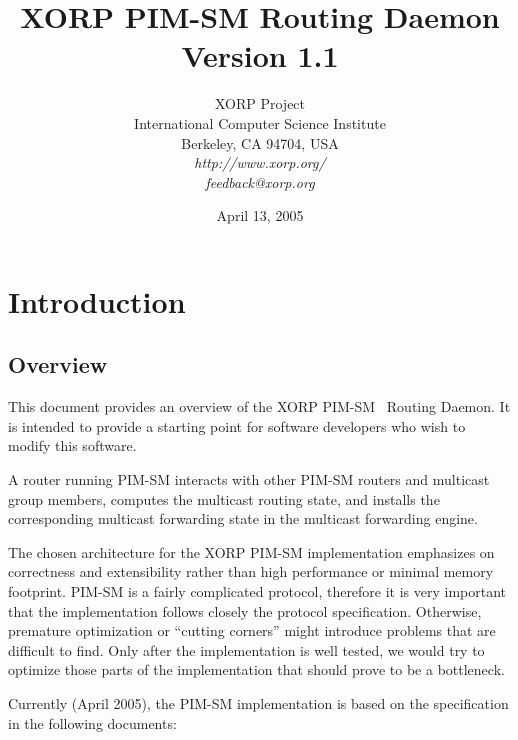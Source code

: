 \documentclass[11pt]{article}
\begin{document}
\title{XORP PIM-SM Routing Daemon \\
\vspace{1ex}
Version 1.1}
\author{ XORP Project					\\
	 International Computer Science Institute	\\
	 Berkeley, CA 94704, USA			\\
         {\it http://www.xorp.org/}			\\
	 {\it feedback@xorp.org}
}
\date{April 13, 2005}

\maketitle

\thispagestyle{empty}


\section{Introduction}


\subsection{Overview}

This document provides an overview of the XORP PIM-SM~\cite{PIM-SM}
Routing Daemon. It is intended to provide a starting point for software
developers who wish to modify this software.

A router running PIM-SM interacts with other PIM-SM routers and
multicast group members, computes the multicast routing state, and installs
the corresponding multicast forwarding state in the multicast forwarding
engine.

The chosen architecture for the XORP PIM-SM implementation emphasizes on
correctness and extensibility rather than high performance or minimal
memory footprint. PIM-SM is a fairly complicated protocol, therefore it
is very important that the implementation follows closely the protocol
specification. Otherwise, premature optimization or ``cutting corners''
might introduce problems that are difficult to find. Only after the
implementation is well tested, we would
try to optimize those parts of the implementation that should prove
to be a bottleneck.

Currently (April 2005), the PIM-SM implementation is based
on the specification in the following documents:
\end{document}
